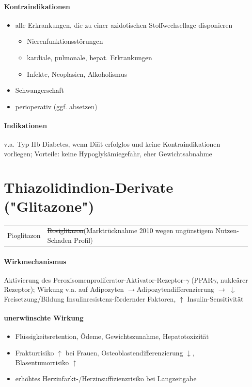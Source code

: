 \documentclass[10pt,a4paper]{report}
\begin{document}
\paragraph{Kontraindikationen} %
\label{subp:kontraindikationen}
\begin{itemize}
	\item alle Erkrankungen, die zu einer azidotischen Stoffwechsellage disponieren
	\begin{itemize}
		\item Nierenfunktionsstörungen
		\item kardiale, pulmonale, hepat. Erkrankungen
		\item Infekte, Neoplasien, Alkoholismus
	\end{itemize}
	\item Schwangerschaft 
	\item perioperativ (ggf. absetzen)
\end{itemize}
\paragraph{Indikationen} %
\label{subp:indikationen}
v.a. Typ IIb Diabetes, wenn Diät erfolglos und keine Kontraindikationen vorliegen; Vorteile: keine Hypoglykämiegefahr, eher Gewichtsabnahme
\section{Thiazolidindion-Derivate ("Glitazone")} %
\label{sec:thiazolidindion_derivate_}

\begin{tabularx}{\textwidth}{XX}
Pioglitazon& \sout{Rosiglitazon}(Marktrücknahme 2010 wegen ungünstigem Nutzen-Schaden Profil)
\end{tabularx}

\paragraph{Wirkmechanismus} %
\label{subp:wirkmechanismus}
Aktivierung des Peroxisomenproliferator-Aktivator-Rezeptor-$\gamma$ (PPAR$\gamma$, nukleärer Rezeptor); Wirkung v.a. auf Adipozyten $\rightarrow$Adipozytendifferenzierung $\rightarrow$ $\downarrow$ Freisetzung/Bildung Insulinresistenz-fördernder Faktoren, $\uparrow$ Insulin-Sensitivität
\paragraph{unerwünschte Wirkung} %
\label{subp:unerw_nschte_wirkung}
\begin{itemize}
	\item Flüssigkeitsretention, Ödeme, Gewichtszunahme, Hepatotoxizität
	\item Frakturrisiko $\uparrow$ bei Frauen, Osteoblastendifferenzierung $\downarrow$, Blasentumorrisiko $\uparrow$
	\item erhöhtes Herzinfarkt-/Herzinsuffizienzrisiko bei Langzeitgabe
\end{itemize}
\end{document}
